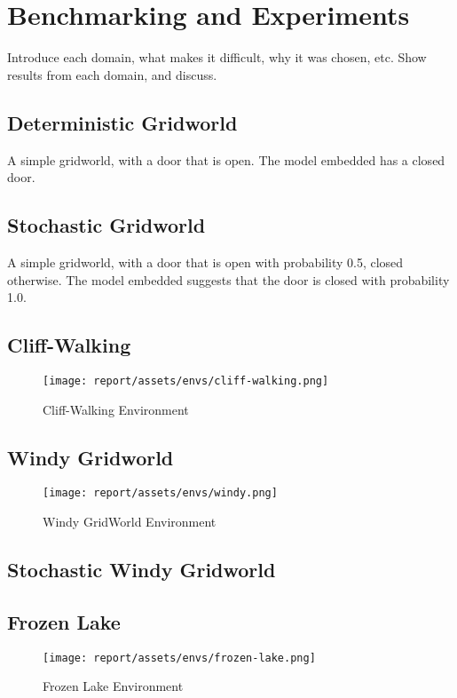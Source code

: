 \chapter{Benchmarking and Experiments}
\label{chapter5}
Introduce each domain, what makes it difficult, why it was chosen, etc. Show results from each domain, and discuss.
\citep{osband2020bsuite, 1606.01540}
\section{Deterministic Gridworld}
A simple gridworld, with a door that is open. The model embedded has a closed door.
\section{Stochastic Gridworld}
A simple gridworld, with a door that is open with probability 0.5, closed otherwise. The model embedded suggests that the door is closed with probability 1.0.
\section{Cliff-Walking}
\begin{figure}[h!]
    \centering
    \texttt{[image: report/assets/envs/cliff-walking.png]}
    \caption{Cliff-Walking Environment \citep{Sutton1998}}
    \label{fig:cliff-walking}
\end{figure}
\citep{1606.01540, Sutton1998}
\section{Windy Gridworld}
\begin{figure}[h!]
    \centering
    \texttt{[image: report/assets/envs/windy.png]}
    \caption{Windy GridWorld Environment \citep{Sutton1998}}
    \label{fig:windy}
\end{figure}
\citep{Sutton1998}
\section{Stochastic Windy Gridworld}
\section{Frozen Lake}
\begin{figure}[h!]
    \centering
    \texttt{[image: report/assets/envs/frozen-lake.png]}
    \caption{Frozen Lake Environment \citep{1606.01540}}
    \label{fig:frozen}
\end{figure}
\citep{1606.01540}
